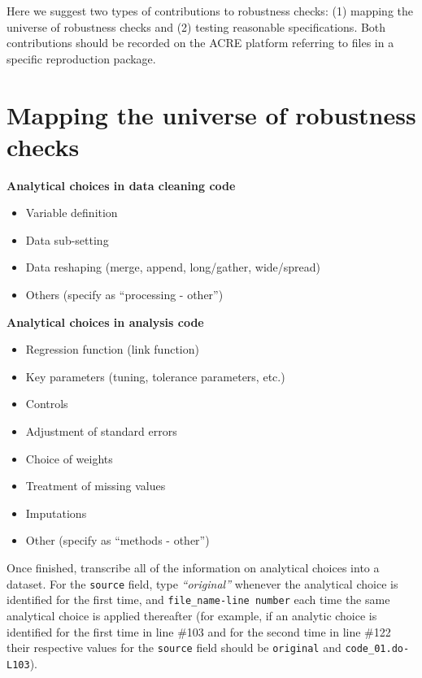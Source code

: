 \documentclass[]{book}
\providecommand{\tightlist}{%
  \setlength{\itemsep}{0pt}\setlength{\parskip}{0pt}}
\begin{document}
Here we suggest two types of contributions to robustness checks: (1) mapping the universe of robustness checks and (2) testing reasonable specifications. Both contributions should be recorded on the ACRE platform referring to files in a specific reproduction package.

\hypertarget{mapping-the-universe-of-robustness-checks}{%
\section{Mapping the universe of robustness checks}\label{mapping-the-universe-of-robustness-checks}}

\textbf{Analytical choices in data cleaning code}

\begin{itemize}
\tightlist
\item
  Variable definition
\item
  Data sub-setting
\item
  Data reshaping (merge, append, long/gather, wide/spread)
\item
  Others (specify as ``processing - other'')
\end{itemize}

\textbf{Analytical choices in analysis code}

\begin{itemize}
\tightlist
\item
  Regression function (link function)
\item
  Key parameters (tuning, tolerance parameters, etc.)
\item
  Controls
\item
  Adjustment of standard errors
\item
  Choice of weights
\item
  Treatment of missing values
\item
  Imputations
\item
  Other (specify as ``methods - other'')
\end{itemize}

Once finished, transcribe all of the information on analytical choices into a dataset. For the \texttt{source} field, type \emph{``original''} whenever the analytical choice is identified for the first time, and \texttt{file\_name-line\ number} each time the same analytical choice is applied thereafter (for example, if an analytic choice is identified for the first time in line \#103 and for the second time in line \#122 their respective values for the \texttt{source} field should be \texttt{original} and \texttt{code\_01.do-L103}).
\end{document}
